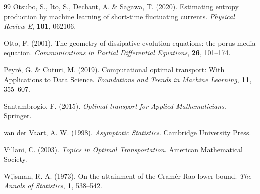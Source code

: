 \documentclass[11pt, a4paper]{article}
\begin{document}
\begin{thebibliography}{99}
	Otsubo, S., Ito, S., Dechant, A. \& Sagawa, T. (2020).
	Estimating entropy production by machine learning of short-time fluctuating currents.
	\textit{Physical Review E}, \textbf{101}, 062106.
	
	Otto, F. (2001).
	The geometry of dissipative evolution equations: the porus media equation.
	\textit{Communications in Partial Differential Equations}, \textbf{26}, 101--174.
	
	Peyr\'{e}, G. \& Cuturi, M. (2019).
	Computational optimal transport: With Applications to Data Science.
	\textit{Foundations and Trends{\textregistered} in Machine Learning}, \textbf{11}, 355--607.
	
	Santambrogio, F. (2015). 
	\textit{Optimal transport for Applied Mathematicians}. 
	Springer.
	
	van der Vaart, A. W. (1998). 
	\textit{Asymptotic Statistics}. 
	Cambridge University Press.
	
	Villani, C. (2003). 
	\textit{Topics in Optimal Transportation}. 
	American Mathematical Society.
	
	Wijsman, R. A. (1973).
	On the attainment of the {C}ram{\'e}r-{R}ao lower bound.
	\textit{The Annals of Statistics}, \textbf{1}, 538--542.
\end{thebibliography}
\end{document}
